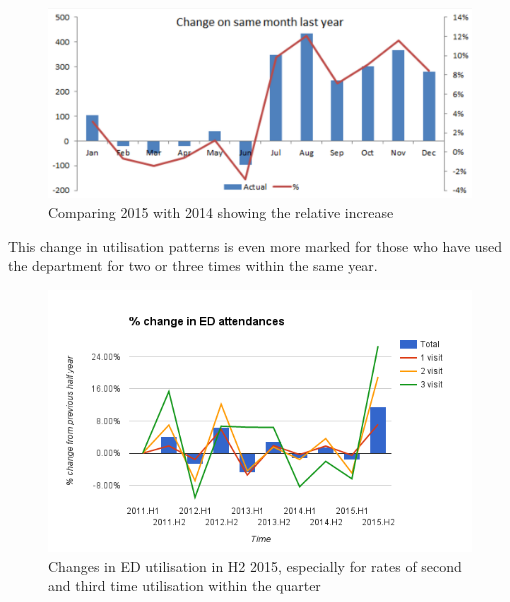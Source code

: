 \documentclass[11pt,a4paper]{article}
\begin{document}
\begin{figure}[htp]
\centering
\includegraphics[scale=0.35]{ED.png}
\caption{Comparing 2015 with 2014 showing the relative increase}
\label{Relative changes in ED utilization}
\end{figure}

This change in utilisation patterns is even more marked for those who have used the department for two or three times within the same year.\\

\begin{figure}[htp]
\centering
\includegraphics[scale=0.70]{Fchange.png}
\caption{Changes in ED utilisation in H2 2015, especially for rates of second and third time utilisation within the quarter}
\label{Changes in ED utilisation}
\end{figure}
\end{document}
